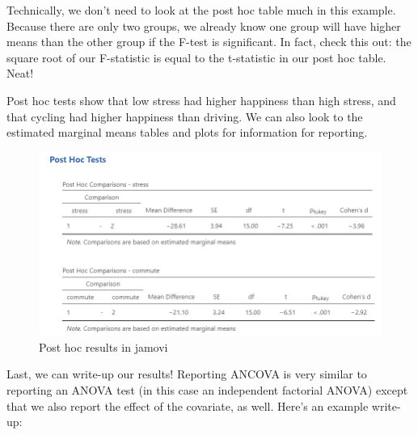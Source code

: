 \documentclass[
]{book}
\begin{document}
Technically, we don't need to look at the post hoc table much in this example. Because there are only two groups, we already know one group will have higher means than the other group if the F-test is significant. In fact, check this out: the square root of our F-statistic is equal to the t-statistic in our post hoc table. Neat!

Post hoc tests show that low stress had higher happiness than high stress, and that cycling had higher happiness than driving. We can also look to the estimated marginal means tables and plots for information for reporting.

\begin{figure}

{\centering \includegraphics[width=1\linewidth]{images/07-ancova/ancova_tukey} 

}

\caption{Post hoc results in jamovi}\label{fig:unnamed-chunk-5}
\end{figure}

Last, we can write-up our results! Reporting ANCOVA is very similar to reporting an ANOVA test (in this case an independent factorial ANOVA) except that we also report the effect of the covariate, as well. Here's an example write-up:
\end{document}

